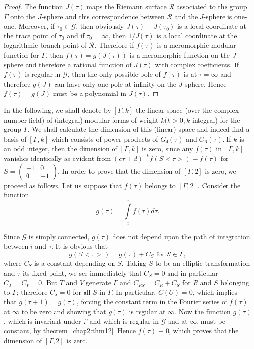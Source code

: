 \begin{proof}
The function $J(\tau)$ maps the Riemann surface $\mathscr{R}$
associated to the group $\Gamma$ onto the $J$-sphere and this
correspondence between $\mathscr{R}$ and the $J$-sphere is
one-one. Moreover, if $\tau_0 \in \mathscr{G}$, then obviously
$J(\tau) - J(\tau_0)$ is a local coordinate at the trace point of
$\tau_0$ and if $\tau_0=\infty$, then $1/J(\tau)$ is a local
coordinate at the logarithmic branch point of $\mathscr{R}$.
Therefore \pageoriginale if $f(\tau)$ is a meromorphic modular function
for $\Gamma$, 
then $f(\tau) = g(J(\tau))$ is a meromorphic function on the
$J$-sphere and therefore a rational function of $J(\tau)$ with complex
coefficients. If $f(\tau)$ is regular in $\mathscr{G}$, then the only
possible pole of $f(\tau)$ is at $\tau=\infty$ and therefore $g(J)$
can have only one pole at infinity on the $J$-sphere. Hence
$f(\tau)=g(J)$ must be a polynomial in $J(\tau)$.
\end{proof}

In the following, we shall denote by $[\Gamma, k]$ the linear space
(over the complex number field) of (integral) modular forms of weight
$k(k>0, k$ integral) for the group $\Gamma$. We shall calculate the
dimension of this (linear) space and indeed find a basis of $[\Gamma,
  k]$ which consists of power-products of $G_4(\tau)$ and
$G_6(\tau)$. If $k$ is an odd integer, then the dimension of
$[\Gamma,k]$ is zero, since any $f(\tau)$ in $[\Gamma, k]$ vanishes
identically as evident from $(c\tau+d)^{-k}f(S<\tau>)=f(\tau)$ for $S=
\left(\begin{smallmatrix} -1 &0\\0&-1 \end{smallmatrix}\right)$. In
order to prove that the dimension of $[\Gamma, 2]$ is zero, we proceed
as follows. Let us suppose that $f(\tau)$ belongs to $[\Gamma,
  2]$. Consider the function
$$
g(\tau) = \int\limits^{\tau}_{i} f(\tau) d\tau.
$$

Since $\mathscr{G}$ is simply connected, $g(\tau)$ does not depend
upon the path of integration between $i$ and $\tau$. It is obvious
that
$$
g(S<\tau>) = g(\tau) + C_S \text{ for } S \in \Gamma, 
$$
where $C_S$ is a constant depending on $S$. Taking $S$ to be an
elliptic transformation and $\tau$ its fixed point, we see immediately
that $C_S=0$ and in particular $C_T=C_V=0$. But $T$ and $V$ generate
$\Gamma$ and $C_{RS} =C_R+C_S$ \pageoriginale for $R$ and $S$
belonging to $\Gamma$; 
therefore $C_S=0$ for all $S$ in $\Gamma$. In particular, $C(U)=0$,
which implies that $g(\tau+1)=g(\tau)$, forcing the constant term in
the Fourier series of $f(\tau)$ at $\infty$ to be zero and showing
that $g(\tau)$ is regular at $\infty$. Now the function $g(\tau)$,
which is invariant under $\Gamma$ and which is regular in
$\mathscr{G}$ and at $\infty$, must be constant, by theorem~\ref{chap2:thm12}. 
Hence $f(\tau)\equiv 0$, which proves that the dimension 
of $[\Gamma, 2]$ is zero.

